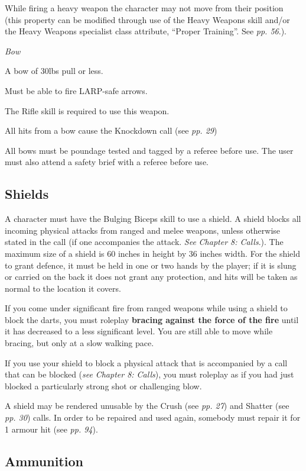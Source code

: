 \documentclass{scrbook}
\begin{document}
While firing a heavy weapon the character may not move from their position (this property can be modified through use of the Heavy Weapons skill and/or the Heavy Weapons specialist class attribute, ``Proper Training''. See \textit{pp. 56}.).

\textit{Bow}

A bow of 30lbs pull or less.

Must be able to fire LARP-safe arrows.

The Rifle skill is required to use this weapon.

All hits from a bow cause the Knockdown call (see \textit{pp. 29})

All bows must be poundage tested and tagged by a referee before use. The user must also attend a safety brief with a referee before use.

\subsection{Shields}

A character must have the Bulging Biceps skill to use a shield. A shield blocks all incoming physical attacks from ranged and melee weapons, unless otherwise stated in the call (if one accompanies the attack. \textit{See} \textit{Chapter 8: Calls}.). The maximum size of a shield is 60 inches in height by 36 inches width. For the shield to grant defence, it must be held in one or two hands by the player; if it is slung or carried on the back it does not grant any protection, and hits will be taken as normal to the location it covers.

If you come under significant fire from ranged weapons while using a shield to block the darts, you must roleplay \textbf{bracing against the force of the fire} until it has decreased to a less significant level. You are still able to move while bracing, but only at a slow walking pace.

If you use your shield to block a physical attack that is accompanied by a call that can be blocked (\textit{see} \textit{Chapter 8: Calls}), you must roleplay as if you had just blocked a particularly strong shot or challenging blow.

A shield may be rendered unusable by the Crush (see \textit{pp. 27}) and Shatter (see \textit{pp. 30}) calls. In order to be repaired and used again, somebody must repair it for 1 armour hit (see \textit{pp. 94}).

\subsection{Ammunition}
\end{document}
